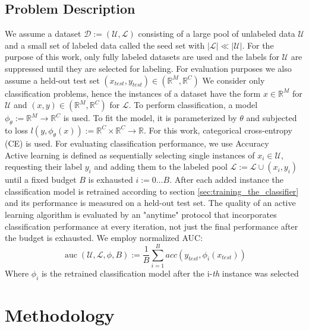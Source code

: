 \documentclass[]{article}
\begin{document}
\subsection{Problem Description}
We assume a dataset $\mathcal{D} := (\mathcal{U}, \mathcal{L})$ consisting of a large pool of unlabeled data $\mathcal{U}$ and a small set of labeled data called the seed set with $|\mathcal{L}| \ll |\mathcal{U|}$. 
For the purpose of this work, only fully labeled datasets are used and the labels for $\mathcal{U}$ are suppressed until they are selected for labeling.
For evaluation purposes we also assume a held-out test set $(x_{test}, y_{test}) \in (\mathbb{R}^M, \mathbb{R}^C)$
We consider only classification problems, hence the instances of a dataset have the form $x \in \mathbb{R}^M$ for $\mathcal{U}$ and $(x, y) \in (\mathbb{R}^M, \mathbb{R}^C)$ for $\mathcal{L}$.
To perform classification, a model $\phi_\theta := \mathbb{R}^M \rightarrow \mathbb{R}^C$ is used. To fit the model, it is parameterized by $\theta$ and subjected to loss $l(y, \phi_\theta(x)) := \mathbb{R}^C \times \mathbb{R}^C \rightarrow \mathbb{R}$. For this work, categorical cross-entropy (CE) is used.
For evaluating classification performance, we use Accuracy \\ [1mm]
Active learning is defined as sequentially selecting single instances of $x_i \in \mathcal{U}$, requesting their label $y_i$ and adding them to the labeled pool $\mathcal{L} := \mathcal{L} \cup (x_i, y_i)$ until a fixed budget $B$ is exhausted $i := 0 \ldots B$.
After each added instance the classification model is retrained according to section \ref{sec:training_the_classifier} and its performance is measured on a held-out test set.
The quality of an active learning algorithm is evaluated by an "anytime" protocol that incorporates classification performance at every iteration, not just the final performance after the budget is exhausted.
We employ normalized AUC:
\begin{equation}
	\operatorname{auc}(\mathcal{U}, \mathcal{L}, \phi, B) := \frac{1}{B} \sum_{i=1}^{B} acc(y_{test}, \phi_i(x_{test}))
\end{equation}
Where $\phi_i$ is the retrained classification model after the i-\textit{th} instance was selected

\section{Methodology}
\end{document}
